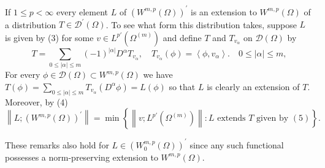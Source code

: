 \begin{para}
  If $1 \leq p<\infty$ every element $L$ of $\left(W^{m,p}(\Omega)\right)^{\prime}$ is an 
  extension to $W^{m,p}(\Omega)$ of a distribution $T \in \mathscr{D}^{\prime}(\Omega)$. To see what form this distribution takes, suppose $L$ is given by (3) for some $v \in L^{p'}(\Omega^{(m)})$ and define $T$ and $T_{v_\alpha}$ on $\mathscr{D}(\Omega)$ by
  \begin{equation}\label{eq:3.5}
    T=\sum_{0 \leq|\alpha| \leq m}(-1)^{|\alpha|} D^\alpha T_{v_\alpha}, \quad T_{v_\alpha}(\phi)=\left\langle\phi, v_\alpha\right\rangle . \quad 0 \leq|\alpha| \leq m,
  \end{equation}
  For every $\phi \in \mathscr{D}(\Omega) \subset W^{m,p}(\Omega)$ we have $T(\phi)=\sum_{0 \leq|\alpha| \leq m} T_{v_\alpha}\left(D^\alpha \phi\right)=L(\phi)$ so that $L$ is clearly an extension of $T$. Moreover, by (4)
  \[
  \left\|L ;\left(W^{m,p}(\Omega)\right)^{\prime}\right\|=\min \left\{\left\|v ; L^{p'}(\Omega^{(m)})\right\|: L \text { extends } T \text { given by }(5)\right\} .
  \]
\end{para}

These remarks also hold for $L \in\left(W_0^{m, p}(\Omega)\right)^{\prime}$ since any such functional possesses a norm-preserving extension to $W^{m,p}(\Omega)$.

